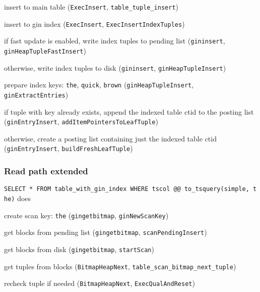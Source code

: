 \documentclass[11pt]{article}
\begin{document}
\begin{nparts}
\item
  insert to main table (\texttt{ExecInsert},
  \texttt{table\_tuple\_insert})
\item
  insert to gin index (\texttt{ExecInsert},
  \texttt{ExecInsertIndexTuples})

  \begin{qparts}
  \item
    if fast update is enabled, write index tuples to pending list
    (\texttt{gininsert}, \texttt{ginHeapTupleFastInsert})
  \item
    otherwise, write index tuples to disk (\texttt{gininsert},
    \texttt{ginHeapTupleInsert})

    \begin{iparts}
    \item
      prepare index keys: \texttt{the}, \texttt{quick}, \texttt{brown}
      (\texttt{ginHeapTupleInsert}, \texttt{ginExtractEntries})
    \item
      if tuple with key already exists, append the indexed table ctid to
      the posting list (\texttt{ginEntryInsert},
      \texttt{addItemPointersToLeafTuple})
    \item
      otherwise, create a posting list containing just the indexed table
      ctid (\texttt{ginEntryInsert}, \texttt{buildFreshLeafTuple})
    \end{iparts}
  \end{qparts}
\end{nparts}

\hypertarget{read-path-extended}{%
\subsubsection{Read path extended}\label{read-path-extended}}

\texttt{SELECT\ *\ FROM\ table\_with\_gin\_index\ WHERE\ tscol\ @@\ to\_tsquery(\textquotesingle{}simple\textquotesingle{},\ \textquotesingle{}the\textquotesingle{})}
does

\begin{nparts}
\item
  create scan key: \texttt{the} (\texttt{gingetbitmap},
  \texttt{ginNewScanKey})
\item
  get blocks from pending list (\texttt{gingetbitmap},
  \texttt{scanPendingInsert})
\item
  get blocks from disk (\texttt{gingetbitmap}, \texttt{startScan})
\item
  get tuples from blocks (\texttt{BitmapHeapNext},
  \texttt{table\_scan\_bitmap\_next\_tuple})
\item
  recheck tuple if needed (\texttt{BitmapHeapNext},
  \texttt{ExecQualAndReset})
\end{nparts}
\end{document}
